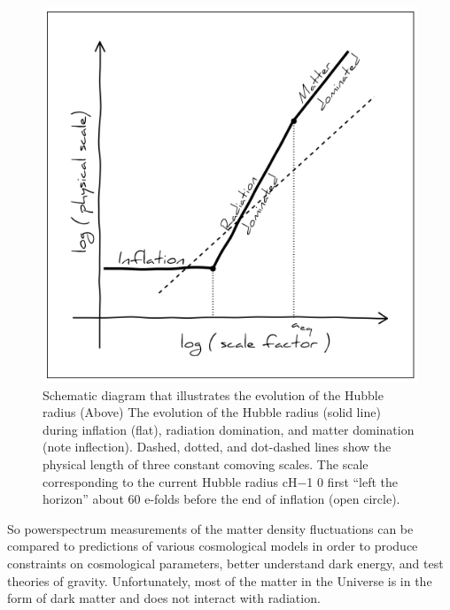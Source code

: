\begin{figure}
\begin{center}
\includegraphics[width=\textwidth]{figs/lifo.png}
\caption{Schematic diagram that illustrates the evolution of the Hubble radius
(Above) The evolution of the Hubble radius (solid line) during inflation (flat), radiation
domination, and matter domination (note inflection). Dashed, dotted, and dot-dashed
lines show the physical length of three constant comoving scales. The scale corresponding
to the current Hubble radius cH−1
0 first “left the horizon” about 60 e-folds before the end
of inflation (open circle).
} \label{fig:lifo}
\end{center}
\end{figure}

So powerspectrum measurements of the matter density fluctuations can be compared
to predictions of various cosmological models in order to produce constraints 
on cosmological parameters, better understand dark energy, and test theories of 
gravity. Unfortunately, most of the matter in the Universe is in the form of dark 
matter and does not interact with radiation. 

